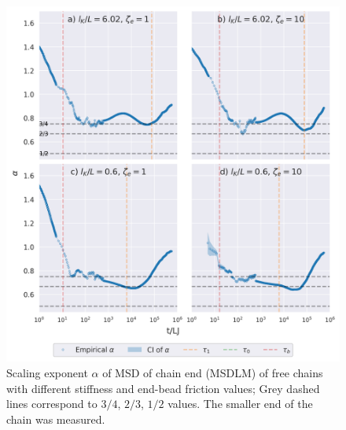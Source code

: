 \documentclass[
    paper=A4,pagesize=automedia,fontsize=12pt,
    BCOR=15mm,DIV=22,
    twoside,headinclude,footinclude=false,
    fleqn,             %
    bibliography=totocnumbered,          %
    listof=totoc,                %
    listof=flat,                 %
    cleardoublepage=empty      %
    numbers=endperiod
]{scrartcl}
\begin{document}
\begin{figure}
    \centering
    \includegraphics[width=\textwidth]{17+18+19+20-exp-alpha-fm.png}
    \caption{Scaling exponent $\alpha$ of MSD of chain end (MSDLM) 
    of free chains with different stiffness and end-bead friction values;
    Grey dashed lines correspond to $3/4$, $2/3$, $1/2$ values.
    The smaller end of the chain was measured. 
    }
    \label{fig:alpha_fm_free}
\end{figure}
\end{document}
